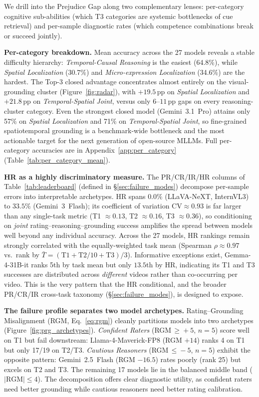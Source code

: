 \documentclass{llmxive}
\providecommand{\gapinv}{Prejudice Gap}
\begin{document}
We drill into the \gapinv{} along two complementary lenses: per-category cognitive sub-abilities (which T3 categories are systemic bottlenecks of cue retrieval) and per-sample diagnostic rates (which competence combinations break or succeed jointly).

\noindent\textbf{Per-category breakdown.} Mean accuracy across the 27 models reveals a stable difficulty hierarchy: \emph{Temporal-Causal Reasoning} is the easiest (64.8\%), while \emph{Spatial Localization} (30.7\%) and \emph{Micro-expression Localization} (34.6\%) are the hardest. The Top-3 closed advantage concentrates almost entirely on the visual-grounding cluster (Figure~\ref{fig:radar}), with $+19.5$\,pp on \emph{Spatial Localization} and $+21.8$\,pp on \emph{Temporal-Spatial Joint}, versus only $6$--$11$\,pp gaps on every reasoning-cluster category. Even the strongest closed model (Gemini~3.1~Pro) attains only 57\% on \emph{Spatial Localization} and 71\% on \emph{Temporal-Spatial Joint}, so fine-grained spatiotemporal grounding is a benchmark-wide bottleneck and the most actionable target for the next generation of open-source MLLMs. Full per-category accuracies are in Appendix~\ref{app:per_category} (Table~\ref{tab:per_category_mean}).

\noindent\textbf{HR as a highly discriminatory measure.} 
The PR/CR/IR/HR columns of Table~\ref{tab:leaderboard} (defined in \S\ref{sec:failure_modes}) decompose per-sample errors into interpretable archetypes. HR spans $0.0\%$ (LLaVA-NeXT, InternVL3) to $33.5\%$ (Gemini~3~Flash); its coefficient of variation $\text{CV}\!\approx\!0.93$ is far larger than any single-task metric (T1 $\approx\!0.13$, T2 $\approx\!0.16$, T3 $\approx\!0.36$), so conditioning on \emph{joint} rating--reasoning--grounding success amplifies the spread between models well beyond any individual accuracy. Across the 27 models, HR rankings remain strongly correlated with the equally-weighted task mean (Spearman $\rho\!\approx\!0.97$ vs.\ rank by $\bar{T}=(\text{T1}+\text{T2}/10+\text{T3})/3$). 
Informative exceptions exist, Gemma-4-31B-it ranks 5th by task mean but only $13.5$th by HR, indicating its T1 and T3 successes are distributed across \emph{different} videos rather than co-occurring per video. This is the very pattern that the HR conditional, and the broader PR/CR/IR cross-task taxonomy (\S\ref{sec:failure_modes}), is designed to expose.

\noindent\textbf{The failure profile separates two model archetypes.} Rating--Grounding Misalignment (RGM, Eq.~\ref{eq:rgm}) cleanly partitions models into two archetypes (Figure~\ref{fig:prg_archetypes}). \emph{Confident Raters} (RGM\,$\geq\!+5$, $n=5$) score well on T1 but fail downstream: Llama-4-Maverick-FP8 (RGM $+14$) ranks 4 on T1 but only 17/19 on T2/T3. \emph{Cautious Reasoners} (RGM\,$\leq\!-5$, $n=5$) exhibit the opposite pattern: Gemini~2.5~Flash (RGM $-16.5$) rates poorly (rank 25) but excels on T2 and T3. The remaining 17 models lie in the balanced middle band ($|\text{RGM}|\!\leq\!4$). The decomposition offers clear diagnostic utility, as confident raters need better grounding while cautious reasoners need better rating calibration.
\end{document}
